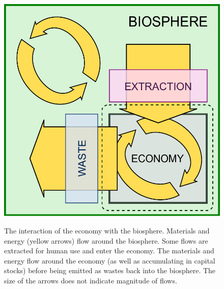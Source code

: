 \begin{figure}[!ht]
\centering\
\includegraphics[width=\linewidth]{Part_0/Chapter_Introduction/images/Biosphere_economy.pdf}
\caption[The biosphere and the economy **** MCD - NEED A BETTER FIGURE TITLE ****]
				{The interaction of the economy with the biosphere.
				Materials and energy (yellow arrows) flow around the biosphere.
				Some flows are extracted for human use and enter the economy.
				The materials and energy flow around the economy 
				(as well as accumulating in capital stocks)
				before being emitted as wastes back into the biosphere.
				The size of the arrows does not indicate magnitude of flows.}
\label{fig:biosphere_economy}
\end{figure}

